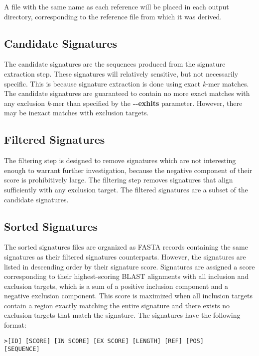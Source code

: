 \documentclass[a4paper,10pt]{article}
\begin{document}
A file with the same name as each reference will be placed in each output directory, corresponding to the reference file from which it was derived.

\subsection{Candidate Signatures}

The candidate signatures are the sequences produced from the signature extraction step. These signatures will relatively sensitive, but not necessarily specific. This is because signature extraction is done using exact \textit{k}-mer matches. The candidate signatures are guaranteed to contain no more exact matches with any exclusion \textit{k}-mer than specified by the \mbox{\textbf{-{}-exhits}} parameter. However, there may be inexact matches with exclusion targets.

\subsection{Filtered Signatures}

The filtering step is designed to remove signatures which are not interesting enough to warrant further investigation, because the negative component of their score is prohibitively large. The filtering step removes signatures that align sufficiently with any exclusion target. The filtered signatures are a subset of the candidate signatures.

\subsection{Sorted Signatures}

The sorted signatures files are organized as FASTA records containing the same signatures as their filtered signatures counterparts. However, the signatures are listed in descending order by their signature score. Signatures are assigned a score corresponding to their highest-scoring BLAST alignments with all inclusion and exclusion targets, which is a sum of a positive inclusion component and a negative exclusion component. This score is maximized when all inclusion targets contain a region exactly matching the entire signature and there exists no exclusion targets that match the signature. The signatures have the following format:

\begin{verbatim}
>[ID] [SCORE] [IN SCORE] [EX SCORE] [LENGTH] [REF] [POS]
[SEQUENCE]
\end{verbatim}
\end{document}

